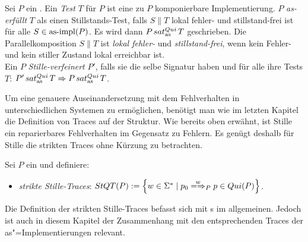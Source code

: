\begin{Def}
  \label{StilleTestDef}
  Sei $P$ ein \MEIO{}. Ein \emph{Test} $T$ für $P$ ist eine zu $P$
  komponierbare Implementierung. $P$ \emph{as-erfüllt} $T$ als einen
  Stillstands-Test, falls $S\|T$ lokal fehler- und
  stillstand-frei ist für alle $S\in \mathrm{as}\text{-}\mathrm{impl} (P)$. Es wird dann $P \hspace{0.05cm}sat_\mathrm{as}^{Qui}\hspace{0.05cm} T$
  geschrieben. Die Parallelkomposition $S\|T$ ist \emph{lokal fehler-} und
  \emph{stillstand-frei}, wenn kein Fehler- und kein stiller Zustand lokal
  erreichbar ist.\\
  Ein \MEIO{} $P$ \emph{Stille-verfeinert} $P'$, falls sie die selbe Signatur
  haben und für alle ihre Tests $T$: $P'\hspace{0.05cm}sat_\mathrm{as}^{Qui}\hspace{0.05cm} T \Rightarrow P\hspace{0.05cm}sat_\mathrm{as}^{Qui}\hspace{0.05cm} T$.
\end{Def}

Um eine genauere Auseinandersetzung mit dem Fehlverhalten in unterschiedlichen
Systemen zu ermöglichen, benötigt man wie im letzten Kapitel die Definition von
Traces auf der Struktur. Wie bereits oben erwähnt, ist Stille ein reparierbares
Fehlverhalten im Gegensatz zu Fehlern. Es genügt deshalb für Stille die
strikten Traces ohne Kürzung zu betrachten.

\begin{Def}
  \label{StilleTraceDef}
  Sei $P$ ein \MEIO{} und definiere:
  \begin{itemize}
    \item \emph{strikte Stille-Traces}: $\StQT (P) := \left\{w\in\Sigma ^*\mid
      p_0 \weakmay[w]_P p\in Qui(P)\right\}$.
  \end{itemize}
\end{Def}

Die Definition der strikten Stille-Traces befasst sich mit \MEIO{}s im
allgemeinen. Jedoch ist auch in diesem Kapitel der Zusammenhang mit den
entsprechenden Traces der as"=Implementierungen relevant.

